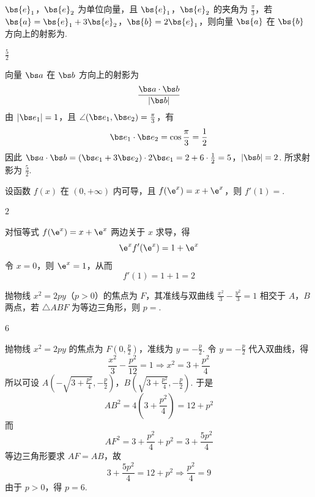 \begin{problem}
\(\bs{e}_{1}\)，\(\bs{e}_{2}\) 为单位向量，且 \(\bs{e}_{1}\)，\(\bs{e}_{2}\) 的夹角为 \(\frac{\pi}{3}\)，若 \(\bs{a} = \bs{e}_{1} + 3\bs{e}_{2}\)，\(\bs{b} = 2\bs{e}_{1}\)，则向量 \(\bs{a}\) 在 \(\bs{b}\) 方向上的射影为\fillinblank{}.
\end{problem}

\begin{answer}
\(\frac{5}{2}\)
\end{answer}

\begin{solution}
向量 \(\bs a\) 在 \(\bs b\) 方向上的射影为
\[
\frac{\bs a\cdot\bs b}{|\bs b|}
\]
由 \(|\bs e_1|=1\)，且 \(\angle(\bs e_1,\bs e_2)=\frac{\pi}{3}\)，有
\[
\bs e_1\cdot\bs e_2=\cos\frac{\pi}{3}=\frac12
\]
因此
\(\bs a\cdot\bs b =(\bs e_1+3\bs e_2)\cdot2\bs e_1 =2+6\cdot\frac12=5\)，\(|\bs b|=2\).
所求射影为 \(\frac{5}{2}\).
\end{solution}

\begin{problem}
设函数 \(f(x)\) 在 \((0, +\infty)\) 内可导，且 \(f(\e^x) = x + \e^x\)，则 \(f'(1) =\)\fillinblank{}.
\end{problem}

\begin{answer}
\(2\)
\end{answer}

\begin{solution}
对恒等式 \(f(\e^x)=x+\e^x\) 两边关于 \(x\) 求导，得
\[
\e^x f'(\e^x)=1+\e^x
\]
令 \(x=0\)，则 \(\e^x=1\)，从而
\[
f'(1)=1+1=2
\]
\end{solution}

\begin{problem}
抛物线 \(x^{2} = 2py\)（\(p > 0\)）的焦点为 \(F\)，其准线与双曲线 \(\frac{x^{2}}{3} - \frac{y^{2}}{3} = 1\) 相交于 \(A\)，\(B\) 两点，若 \(\triangle ABF\) 为等边三角形，则 \(p =\)\fillinblank{}.
\end{problem}

\begin{answer}
\(6\)
\end{answer}

\begin{solution}
抛物线 \(x^2=2py\) 的焦点为 \(F(0,\frac{p}{2})\)，准线为 \(y=-\frac{p}{2}\). 令 \(y=-\frac{p}{2}\) 代入双曲线，得
\[
\frac{x^2}{3}-\frac{p^2}{12}=1
\Longrightarrow
x^2=3+\frac{p^2}{4}
\]
所以可设
\(A\left(-\sqrt{3+\frac{p^2}{4}},-\frac p2\right)\)，\(B\left(\sqrt{3+\frac{p^2}{4}},-\frac p2\right)\).
于是
\[
AB^2=4\left(3+\frac{p^2}{4}\right)=12+p^2
\]
而
\[
AF^2=3+\frac{p^2}{4}+p^2=3+\frac{5p^2}{4}
\]
等边三角形要求 \(AF=AB\)，故
\[
3+\frac{5p^2}{4}=12+p^2
\Longrightarrow
\frac{p^2}{4}=9
\]
由于 \(p>0\)，得 \(p=6\).
\end{solution}


